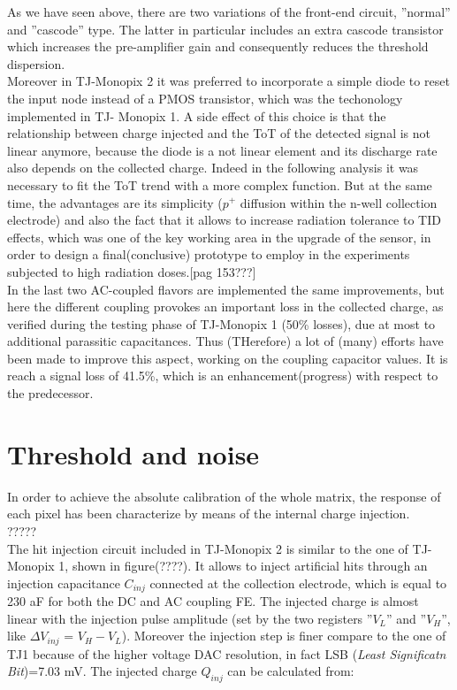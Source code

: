 As we have seen above, there are two variations of the front-end circuit,  ''normal'' and ''cascode'' type. The latter in particular includes an extra cascode transistor which increases the pre-amplifier gain and consequently reduces the threshold dispersion.\\
Moreover in TJ-Monopix 2 it was preferred to incorporate a simple diode to reset the input node instead of a PMOS transistor, which was the techonology implemented in TJ- Monopix 1. A side effect of this choice is that the relationship between charge injected and the ToT of the detected signal is not linear anymore, because the diode is a not linear element and its discharge rate also depends on the collected charge. Indeed in the following analysis it was necessary to fit the ToT trend with a more complex function. But at the same time, the advantages are its simplicity ($p^{+}$ diffusion within the n-well collection electrode) and also the fact that it allows to increase radiation tolerance to TID effects, which was one of the key working area in the upgrade of the sensor, in order to design a final(conclusive) prototype to employ in the experiments subjected to high radiation doses.[pag 153???] \\


In the last two AC-coupled flavors are implemented the same improvements, but here the different coupling provokes an important loss in the collected charge, as verified during the testing phase of TJ-Monopix 1 (50\% losses), due at most to additional parassitic capacitances. Thus (THerefore) a lot of (many) efforts have been made to improve this aspect, working on the coupling capacitor values. It is reach a signal loss of 41.5\%, which is an enhancement(progress) with respect to the predecessor.





\section{Threshold and noise}

In order to achieve the absolute calibration of the whole matrix, the response of each pixel has been characterize by means of the internal charge injection. \\
?????\\
The hit injection circuit included in TJ-Monopix 2 is similar to the one of TJ-Monopix 1, shown in figure(????). It allows to inject artificial hits through an injection capacitance \textbf{$C_{inj}$} connected at the collection electrode, which is equal to 230 aF for both the DC and AC coupling FE. The injected charge is almost linear with the injection pulse amplitude (set by the two registers ''\textbf{$V_{L}$}'' and ''\textbf{$V_{H}$}'', like $\Delta V_{inj}$ = \textbf{$V_{H}-V_{L}$}). Moreover the injection step is finer compare to the one of TJ1 because of the higher voltage DAC resolution, in fact LSB (\textit{Least Significatn Bit})=7.03 mV. The injected charge $Q_{inj}$ can be calculated from:

